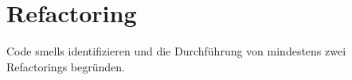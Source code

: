 \chapter{Refactoring}
Code smells identifizieren und die Durchführung von mindestens zwei Refactorings begründen.